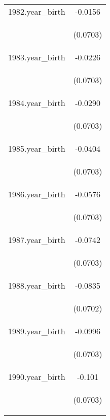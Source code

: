 \documentclass[]{article}
\begin{document}
\begin{center}
\begin{tabular}{lc}
1982.year\_birth & -0.0156 \\
\vspace{4pt} & \begin{footnotesize}(0.0703)\end{footnotesize} \\
1983.year\_birth & -0.0226 \\
\vspace{4pt} & \begin{footnotesize}(0.0703)\end{footnotesize} \\
1984.year\_birth & -0.0290 \\
\vspace{4pt} & \begin{footnotesize}(0.0703)\end{footnotesize} \\
1985.year\_birth & -0.0404 \\
\vspace{4pt} & \begin{footnotesize}(0.0703)\end{footnotesize} \\
1986.year\_birth & -0.0576 \\
\vspace{4pt} & \begin{footnotesize}(0.0703)\end{footnotesize} \\
1987.year\_birth & -0.0742 \\
\vspace{4pt} & \begin{footnotesize}(0.0703)\end{footnotesize} \\
1988.year\_birth & -0.0835 \\
\vspace{4pt} & \begin{footnotesize}(0.0702)\end{footnotesize} \\
1989.year\_birth & -0.0996 \\
\vspace{4pt} & \begin{footnotesize}(0.0703)\end{footnotesize} \\
1990.year\_birth & -0.101 \\
\vspace{4pt} & \begin{footnotesize}(0.0703)\end{footnotesize} \\

\end{tabular}
\end{center}
\end{document}
